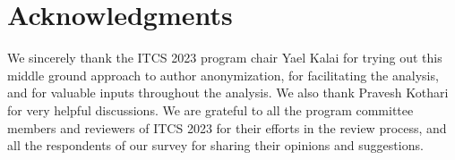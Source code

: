 \documentclass{article}
\begin{document}

\section*{Acknowledgments} 
We sincerely thank the ITCS 2023 program chair Yael Kalai for trying out this middle ground approach to author anonymization, for facilitating the analysis, and for  valuable inputs throughout the analysis. We also thank Pravesh Kothari for very helpful discussions. We are grateful to all the program committee members and reviewers of ITCS 2023 for their efforts in the review process, and all the respondents of our survey for sharing their opinions and suggestions. 

\let\OLDthebibliography\thebibliography
\renewcommand\thebibliography[1]{
  \OLDthebibliography{#1}
  \setlength{\parskip}{5pt}
  \setlength{\itemsep}{0pt plus 0.3ex}
}
\printbibliography
\end{document}
